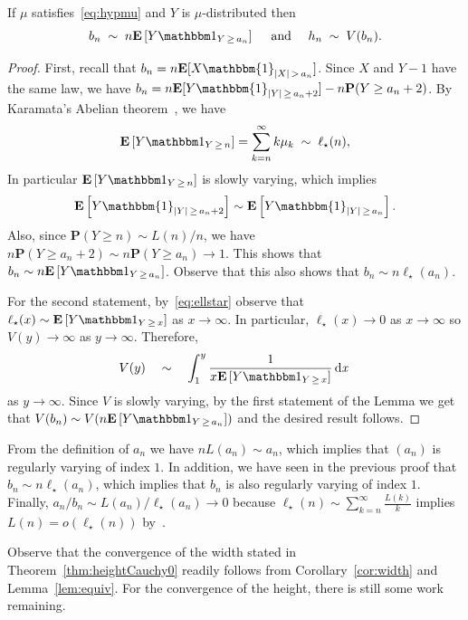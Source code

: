 \documentclass[AHL,Unicode,longabstracts,published]{cedram}
\newcommand{\p}{\mathbf{P}}
\newcommand{\E}[1]{{\mathbf E}\left[#1\right]}
\newcommand{\bfE}{\mathbf{E}}
\DeclareMathOperator{\dxseq}{d\mathit{x}}
\newcommand{\I}[1]{{\mathbbm 1}_{#1}}
\begin{document}
\begin{lemm}\label{lem:equiv}
If $\mu$ satisfies~\eqref{eq:hypmu} and $Y$ is $\mu$-distributed then
\[
b_{n} \;\sim \; n \E{Y\I{Y\,\ge\,a_n}} \quad \text{ and }\quad h_{n} \; \sim \; V(b_{n}).
\]
\end{lemm}

\begin{proof}
First, recall that $b_{n}=n \bfE[X \mathbbm{1}_{|X|\,> \,a_{n}}]$. Since $X$ and $Y-1$ have the same law, we have $b_{n}=n \bfE[ Y\mathbbm{1}_{|Y|\,\geq\,a_{n}+2}]-n \p(Y \geq a_{n}+2)$. By Karamata's Abelian theorem~\cite[Theorem~8.1.6]{BGT89}, we have
\begin{equation}\label{eq:ellstar}
\E{Y \I{Y\,\ge\,n}} = \sum_{k=n}^{\infty} k \mu_k \; \sim \; \ell_{\star}(n),
\end{equation}
In particular $\E{Y \I{Y\,\ge\,n}}$ is slowly varying, which implies
\[
\E{ Y\mathbbm{1}_{|Y|\,\geq\,a_{n}+2}} \sim \E{ Y\mathbbm{1}_{|Y|\,\geq\,a_{n}}}.
\]
Also, since $\p(Y \geq n) \sim L(n)/n$, we have $n \p(Y \geq a_{n}+2) \sim n\p(Y \geq a_{n}) \rightarrow 1$. This shows that $ b_{n} \sim n \E{Y\I{Y \,\ge\,a_n}}$. Observe that this also shows that $b_{n} \sim n \ell_{\star}(a_{n})$.

For the second statement, by~\eqref{eq:ellstar} observe that $\ell_{\star}(x) \sim \E{Y \I{Y\,\ge\,x}}$ as $x \rightarrow \infty$. In particular, $\ell_\star(x)\to 0$ as $x\to\infty$ so $V(y)\to \infty$ as $y\to \infty$. Therefore,
\[
V(y) \quad \sim \quad \int_1^{y} \frac{1}{ x \E{Y \I{Y\, \ge\,x}}} \dxseq\,
\]
as $y \rightarrow \infty$. Since $V$ is slowly varying, by the first statement of the Lemma we get that $V(b_{n}) \sim V(n \E{Y\I{Y\,\ge\,a_n}})$ and the desired result follows.
\end{proof}


\begin{rema}\label{rk:anbn}
From the definition of $a_{n}$ we have $n L(a_{n}) \sim a_{n}$, which implies that $(a_{n})$ is regularly varying of index $1$. In addition, we have seen in the previous proof that $b_{n} \sim n \ell_{\star}(a_{n})$, which implies that $b_{n}$ is also regularly varying of index $1$. Finally, $a_{n}/b_{n} \sim L(a_{n})/\ell_{\star}(a_{n}) \rightarrow 0$ because $\ell_{\star}(n) \sim \sum_{k=n}^{\infty} \frac{L(k)}{k} $ implies $L(n)=o(\ell_{\star}(n))$ by~\cite[Proposition~1.5.9b]{BGT89}.
\end{rema}

Observe that the convergence of the width stated in Theorem~\ref{thm:heightCauchy0} readily follows from Corollary~\ref{cor:width} and Lemma~\ref{lem:equiv}. For the convergence of the height, there is still some work remaining.
\end{document}
